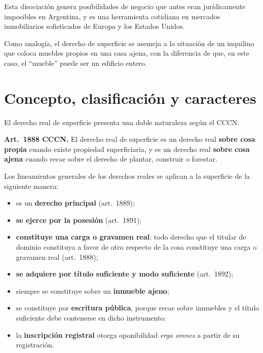 \documentclass[12pt,oneside]{book}
\begin{document}
\begin{important}
Esta disociación genera posibilidades de negocio que antes eran jurídicamente imposibles en Argentina, y es una herramienta cotidiana en mercados inmobiliarios sofisticados de Europa y los Estados Unidos.
\end{important}

\begin{note}
Como analogía, el derecho de superficie se asemeja a la situación de un inquilino que coloca muebles propios en una casa ajena, con la diferencia de que, en este caso, el ``mueble'' puede ser un edificio entero.
\end{note}

\section{Concepto, clasificación y caracteres}

El derecho real de superficie presenta una doble naturaleza según el CCCN.

\begin{important}
\textbf{Art.~1888 CCCN.} El derecho real de superficie es un derecho real \textbf{sobre cosa propia} cuando existe propiedad superficiaria, y es un derecho real \textbf{sobre cosa ajena} cuando recae sobre el derecho de plantar, construir o forestar.
\end{important}

Los lineamientos generales de los derechos reales se aplican a la superficie de la siguiente manera:

\begin{itemize}
    \item es un \textbf{derecho principal} (art.~1889);
    \item \textbf{se ejerce por la posesión} (art.~1891);
    \item \textbf{constituye una carga o gravamen real}: todo derecho que el titular de dominio constituya a favor de otro respecto de la cosa constituye una carga o gravamen real (art.~1888);
    \item \textbf{se adquiere por título suficiente y modo suficiente} (art.~1892);
    \item siempre se constituye sobre un \textbf{inmueble ajeno};
    \item se constituye por \textbf{escritura pública}, porque recae sobre inmuebles y el título suficiente debe contenerse en dicho instrumento;
    \item la \textbf{inscripción registral} otorga oponibilidad \textit{erga omnes} a partir de su registración.
\end{itemize}
\end{document}
